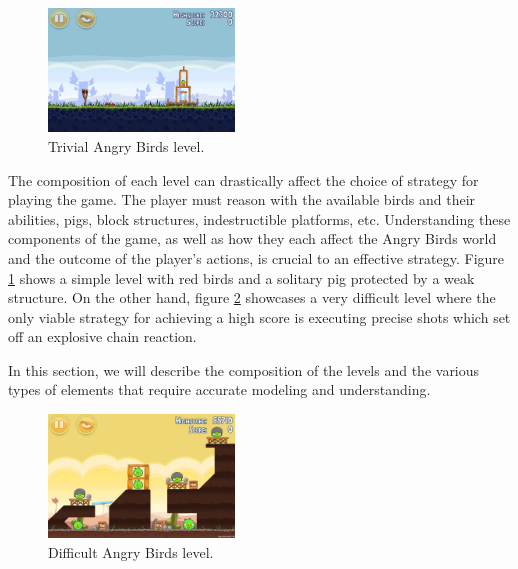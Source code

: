 







\begin{figure}
\begin{center}
\includegraphics[trim = 0 100 0 150, clip, width=0.44\textwidth]{images/level.PNG}
\end{center}
\caption{Trivial Angry Birds level.}
\label{fig:easy-level}
\end{figure}

The composition of each level can drastically affect the choice of strategy for playing the game. The player must reason with the available birds and their abilities, pigs, block structures, indestructible platforms, etc. Understanding these components of the game, as well as how they each affect the Angry Birds world and the outcome of the player's actions, is crucial to an effective strategy. 
Figure \ref{fig:easy-level} shows a simple level with red birds and a solitary pig protected by a weak structure. On the other hand, figure \ref{fig:hard-level} showcases a very difficult level where the only viable strategy for achieving a high score is executing precise shots which set off an explosive chain reaction. 


In this section, we will describe the composition of the levels and the various types of elements that require accurate modeling and understanding. 
\setlength{\belowcaptionskip}{-8pt}

\begin{figure}
\begin{center}
\includegraphics[trim = 0 20 0 20, clip, width=0.44\textwidth]{images/hard-level.jpg}
\end{center}
\caption{Difficult Angry Birds level.}
\label{fig:hard-level}
\end{figure}

